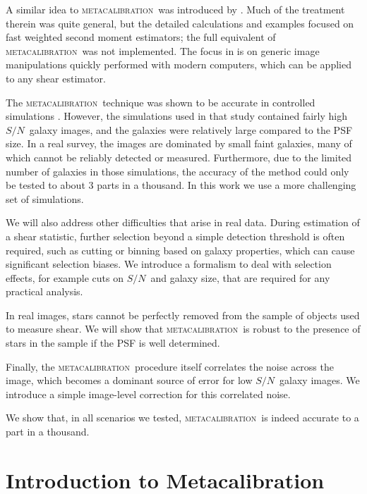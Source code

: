 \documentclass[iop]{emulateapj}
\newcommand{\snr}{$S/N$}
\newcommand{\mcal}{\textsc{metacalibration}}
\begin{document}
A similar idea to \mcal\ was introduced by \cite{Kaiser2000}.  Much of the
treatment therein was quite general, but the detailed calculations and examples
focused on fast weighted second moment estimators; the full equivalent of
\mcal\ was not implemented.  The focus in \citep{HuffMcal} is on generic image
manipulations quickly performed with modern computers, which can be applied
to any shear estimator. 


The \mcal\ technique was shown to be accurate in controlled simulations
\citep{HuffMcal}.  However, the simulations used in that study \citep[based on
those used in][]{great3} contained fairly high \snr\ galaxy images, and the
galaxies were relatively large compared to the PSF size.  In a real survey, the
images are dominated by small faint galaxies, many of which cannot be reliably
detected or measured.  Furthermore, due to the limited number of galaxies in
those simulations, the accuracy of the method could only be tested to about 3
parts in a thousand.  In this work we use a more challenging set of
simulations.

We will also address other difficulties that arise in real data.  During
estimation of a shear statistic, further selection beyond a simple detection
threshold is often required, such as cutting or binning based on galaxy
properties, which can cause significant selection biases.  We introduce a
formalism to deal with selection effects, for example cuts on \snr\ and galaxy
size, that are required for any practical analysis. 

In real images, stars cannot be perfectly removed from the sample of objects
used to measure shear. We will show that \mcal\ is robust to the presence of
stars in the sample if the PSF is well determined.


Finally, the \mcal\ procedure itself correlates the noise across the image,
which becomes a dominant source of error for low \snr\ galaxy images.  We
introduce a simple image-level correction for this correlated noise.

We show that, in all scenarios we tested, \mcal\ is indeed accurate to a part
in a thousand.

\section{Introduction to Metacalibration} \label{sec:mcal}
\end{document}
